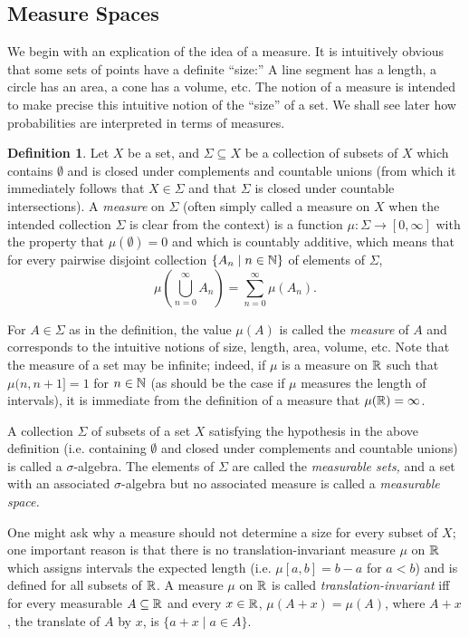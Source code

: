 \documentclass[leqno]{article}
\theoremstyle{definition}
\newtheorem{definition}[theorem]{Definition}
\newcommand{\bldset}[2]{\{{#1}\mid{#2}\}}
\begin{document}
\subsection{Measure Spaces}

We begin with an explication of the idea of a measure. It is intuitively obvious that some sets of points have a definite ``size:'' A line segment has a length, a circle has an area, a cone has a volume, etc. The notion of a measure is intended to make precise this intuitive notion of the ``size'' of a set. We shall see later how probabilities are interpreted in terms of measures.

\begin{definition}
Let $X$ be a set, and $\Sigma \subseteq X$ be a collection of subsets of $X$ which contains $\emptyset$ and is closed under complements and countable unions (from which it immediately follows that $X \in \Sigma$ and that $\Sigma$ is closed under countable intersections). A {\em measure} on $\Sigma$ (often simply called a measure on $X$ when the intended collection $\Sigma$ is clear from the context) is a function $\mu\colon \Sigma \rightarrow [0, \infty]$ with the property that $\mu(\emptyset) = 0$ and which is countably additive, which means that for every pairwise disjoint collection $\bldset{A_n}{n \in \N}$ of elements of $\Sigma$,
\[ \mu\left(\bigcup_{n = 0}^\infty A_n\right) = \sum_{n=0}^\infty \mu(A_n). \]
\end{definition}

For $A \in \Sigma$ as in the definition, the value $\mu(A)$ is called the {\em measure} of $A$ and corresponds to the intuitive notions of size, length, area, volume, etc. Note that the measure of a set may be infinite; indeed, if $\mu$ is a measure on $\mathbb{R}$ such that $\mu(n, n+1] = 1$ for $n \in \mathbb{N}$ (as should be the case if $\mu$ measures the length of intervals), it is immediate from the definition of a measure that $\mu(\mathbb{R}) = \infty$.

A collection $\Sigma$ of subsets of a set $X$ satisfying the hypothesis in the above definition (i.e. containing $\emptyset$ and closed under complements and countable unions) is called a $\sigma$-algebra. The elements of $\Sigma$ are called the {\em measurable sets,} and a set with an associated $\sigma$-algebra but no associated measure is called a {\em measurable space.} 

One might ask why a measure should not determine a size for every subset of $X$; one important reason is that there is no translation-invariant measure $\mu$ on $\mathbb{R}$ which assigns intervals the expected length (i.e. $\mu [a,b] = b - a$ for $a < b$) and is defined for all subsets of $\mathbb{R}$. A measure $\mu$ on $\mathbb{R}$ is called {\em translation-invariant} iff for every measurable $A \subseteq \mathbb{R}$ and every $x \in \mathbb{R}$, $\mu(A + x) = \mu(A)$, where $A + x$, the translate of $A$ by $x$, is $\bldset{a + x}{a \in A}$. 
\end{document}
